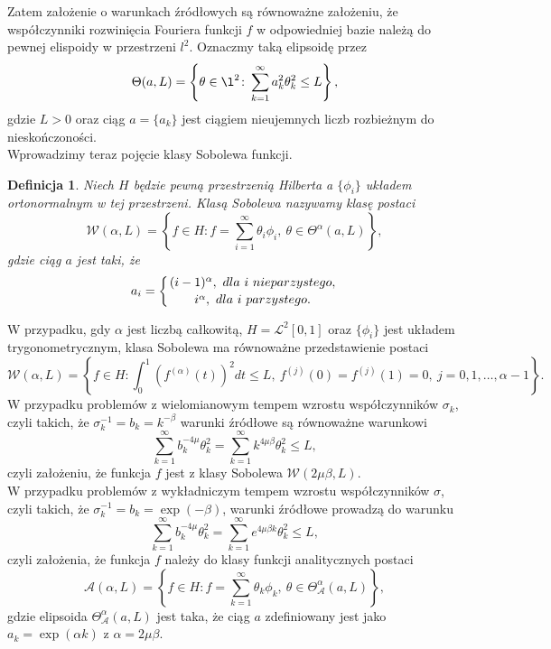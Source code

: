 \documentclass{article}
\newtheorem{df}{Definicja}
\begin{document}
Zatem założenie o warunkach źródłowych są równoważne założeniu, że współczynniki rozwinięcia Fouriera funkcji $f$ w odpowiedniej bazie należą do pewnej elispoidy w przestrzeni $l^2$. Oznaczmy taką elipsoidę przez
\begin{displaymath}
\Theta(a,L)=\left\{\theta\in \l^2\colon \sum_{k=1}^{\infty}a_k^2\theta_k^2\leq L\right\},
\end{displaymath}
gdzie $L>0$ oraz ciąg $a=\{a_k\}$ jest ciągiem nieujemnych liczb rozbieżnym do nieskończoności.\\
Wprowadzimy teraz pojęcie klasy Sobolewa funkcji.
\begin{df}
Niech $H$ będzie pewną przestrzenią Hilberta a $\{\phi_i\}$ układem ortonormalnym w tej przestrzeni. Klasą Sobolewa nazywamy klasę postaci 
\begin{displaymath}
\mathcal{W}(\alpha,L)=\left\{f\in H\colon f=\sum_{i=1}^{\infty}\theta_i\phi_i,\ \theta\in \Theta^{\alpha}(a,L)\right\},
\end{displaymath}
gdzie ciąg $a$ jest taki, że 
\begin{displaymath}
a_i=\left\{{(i-1)^{\alpha},\ dla\ i\ nieparzystego,}\atop {i^{\alpha},\ dla\ i\ parzystego.}\right.
\end{displaymath}
\end{df}
W przypadku, gdy $\alpha$ jest liczbą całkowitą, $H=\mathcal{L}^2[0,1]$ oraz $\{\phi_i\}$ jest układem trygonometrycznym, klasa Sobolewa ma równoważne przedstawienie postaci
\begin{displaymath}
\mathcal{W}(\alpha,L)=\left\{f\in H\colon\int_0^1\left(f^{(\alpha)}(t)\right)^2dt\leq L,\ f^{(j)}(0)=f^{(j)}(1)=0,\ j=0,1,\dots ,\alpha -1\right\}.
\end{displaymath}
W przypadku problemów z wielomianowym tempem wzrostu współczynników $\sigma_k$, czyli takich, że $\sigma_k^{-1}=b_k=k^{-\beta}$ warunki źródłowe są równoważne warunkowi
\begin{displaymath}
\sum_{k=1}^{\infty}b_k^{-4\mu} \theta_k^2=\sum_{k=1}^{\infty}k^{4\mu\beta}\theta_k^2\leq L,
\end{displaymath}
czyli założeniu, że funkcja $f$ jest z klasy Sobolewa $\mathcal{W}(2\mu\beta,L)$.\\
W przypadku problemów z wykładniczym tempem wzrostu współczynników $\sigma$, czyli takich, że $\sigma_k^{-1}=b_k=\exp(-\beta)$, warunki źródłowe prowadzą do warunku
\begin{displaymath}
\sum_{k=1}^{\infty}b_k^{-4\mu} \theta_k^2=\sum_{k=1}^{\infty}e^{4\mu\beta k}\theta_k^2\leq L,
\end{displaymath}
czyli założenia, że funkcja $f$ należy do klasy funkcji analitycznych postaci
\begin{displaymath}
\mathcal{A}(\alpha,L)=\left\{f\in H\colon f=\sum_{k=1}^{\infty}\theta_k\phi_k,\ \theta\in \Theta_{\mathcal{A}}^{\alpha}(a,L)\right\},
\end{displaymath}
gdzie elipsoida $\Theta_{\mathcal{A}}^{\alpha}(a,L)$ jest taka, że ciąg $a$ zdefiniowany jest jako $a_k=\exp (\alpha k)$ z $\alpha = 2\mu \beta$.
\end{document}
